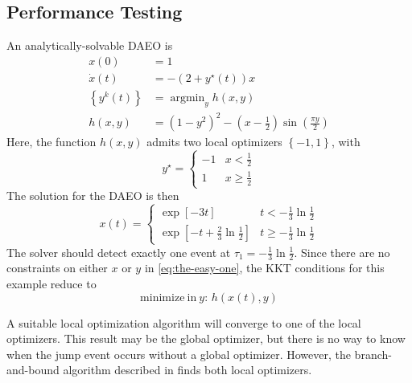 \documentclass[twoside,leqno, twocolumn]{article}
\DeclareMathOperator*{\argmin}{\arg\min}
\begin{document}
\subsection{Performance Testing}
An analytically-solvable DAEO is
\begin{equation}
	\label{eq:the-easy-one}
	\begin{aligned}
		x(0) &= 1\\
		\dot x(t) &= -(2+y^\star(t))x\\
		\left\{y^k(t)\right\} &= \argmin_y h(x,y)\\
		h(x, y) &= (1-y^2)^2 - (x-\frac{1}{2})\sin\left(\frac{\pi y}{2}\right) 
	\end{aligned}
\end{equation}
Here, the function $h(x, y)$ admits two local optimizers $\left\{-1, 1\right\}$, with 
\begin{equation*}
	y^\star = \begin{cases}
		-1 & x<\frac{1}{2}\\
		1 & x \geq \frac{1}{2}
	\end{cases}
\end{equation*}
The solution for the DAEO is then
\begin{equation}
	\label{eq:easy-daeo-solution}
	x(t) = \begin{cases}
		\exp\left[-3t\right] & t < -\frac{1}{3}\ln\frac{1}{2} \\
		\exp\left[-t + \frac{2}{3}\ln\frac{1}{2}\right] & t \geq -\frac{1}{3}\ln\frac{1}{2}
	\end{cases}
\end{equation}
The solver should detect exactly one event at $\tau_1 = -\frac{1}{3}\ln\frac{1}{2}$.
Since there are no constraints on either $x$ or $y$ in \eqref{eq:the-easy-one}, the KKT conditions for this example reduce to
\begin{equation*}
	\mathrm{minimize\ in\ } y:\,h\left(x(t), y\right)
\end{equation*}

A suitable local optimization algorithm will converge to one of the local optimizers. This result may be the global optimizer, but there is no way to know when the jump event occurs without a global optimizer. However, the branch-and-bound algorithm described in  finds both local optimizers.
\end{document}
